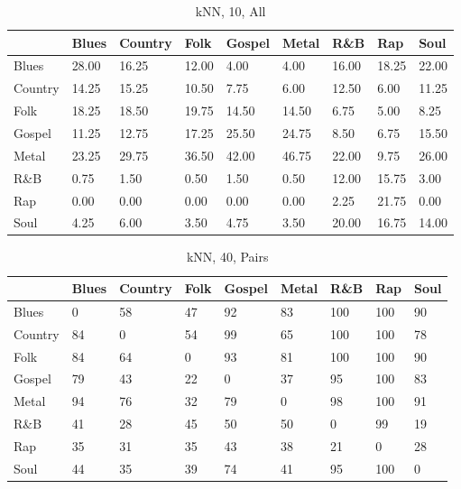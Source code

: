 \documentclass[a4paper,oneside]{article}
\begin{document}
\begin{table}[H]\centering
\caption{kNN, 10, All}
\begin{tabu}{l|*{8}{l}}
 & Blues & Country & Folk & Gospel & Metal & R\&B & Rap & Soul \\ \hline
Blues & 28.00 & 16.25 & 12.00 & 4.00 & 4.00 & 16.00 & 18.25 & 22.00 \\
Country & 14.25 & 15.25 & 10.50 & 7.75 & 6.00 & 12.50 & 6.00 & 11.25 \\
Folk & 18.25 & 18.50 & 19.75 & 14.50 & 14.50 & 6.75 & 5.00 & 8.25 \\
Gospel & 11.25 & 12.75 & 17.25 & 25.50 & 24.75 & 8.50 & 6.75 & 15.50 \\
Metal & 23.25 & 29.75 & 36.50 & 42.00 & 46.75 & 22.00 & 9.75 & 26.00 \\
R\&B & 0.75 & 1.50 & 0.50 & 1.50 & 0.50 & 12.00 & 15.75 & 3.00 \\
Rap & 0.00 & 0.00 & 0.00 & 0.00 & 0.00 & 2.25 & 21.75 & 0.00 \\
Soul & 4.25 & 6.00 & 3.50 & 4.75 & 3.50 & 20.00 & 16.75 & 14.00 \\
\end{tabu}
\end{table}

\begin{table}[H]\centering
\caption{kNN, 40, Pairs}
\begin{tabu}{l|*{8}{l}}
 & Blues & Country & Folk & Gospel & Metal & R\&B & Rap & Soul \\ \hline
Blues & 0 & 58 & 47 & 92 & 83 & 100 & 100 & 90 \\
Country & 84 & 0 & 54 & 99 & 65 & 100 & 100 & 78 \\
Folk & 84 & 64 & 0 & 93 & 81 & 100 & 100 & 90 \\
Gospel & 79 & 43 & 22 & 0 & 37 & 95 & 100 & 83 \\
Metal & 94 & 76 & 32 & 79 & 0 & 98 & 100 & 91 \\
R\&B & 41 & 28 & 45 & 50 & 50 & 0 & 99 & 19 \\
Rap & 35 & 31 & 35 & 43 & 38 & 21 & 0 & 28 \\
Soul & 44 & 35 & 39 & 74 & 41 & 95 & 100 & 0 \\
\end{tabu}
\end{table}
\end{document}
